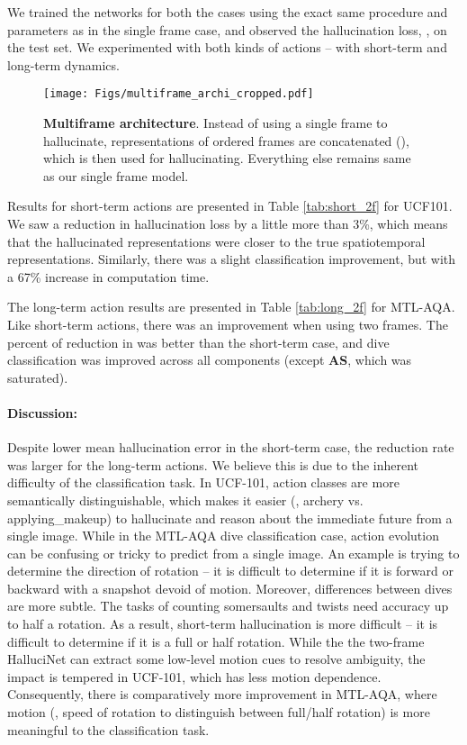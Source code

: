 \documentclass[10pt,twocolumn,letterpaper]{article}
\begin{document}
We trained the networks for both the cases using the exact same procedure and parameters as in the single frame case, and observed the hallucination loss, , on the test set. We experimented with both kinds of actions -- with short-term and long-term dynamics.

\begin{figure}
\centering
\texttt{[image: Figs/multiframe\_archi\_cropped.pdf]} 
\caption{\textbf{Multiframe architecture}. Instead of using a single frame to hallucinate, representations of ordered frames are concatenated (), which is then used for hallucinating. Everything else remains same as our single frame model.}
\label{fig:multiframe_archi}
\end{figure}

Results for short-term actions are presented in Table \ref{tab:short_2f} for UCF101. We saw a reduction in hallucination loss by a little more than 3\%, which means that the hallucinated representations were closer to the true spatiotemporal representations. Similarly, there was a slight classification improvement, but with a 67\% increase in computation time.

The long-term action results are presented in Table \ref{tab:long_2f} for MTL-AQA. Like short-term actions, there was an improvement when using two frames.  The percent of reduction in  was better than the short-term case, and dive classification was improved across all components (except \textbf{AS}, which was saturated).  


\paragraph{Discussion:} Despite lower mean hallucination error in the short-term case, the reduction rate was larger for the long-term actions.  We believe this is due to the inherent difficulty of the classification task.  In UCF-101, action classes are more semantically distinguishable, which makes it easier (\eg, archery vs. applying\_makeup) to hallucinate and reason about the immediate future from a single image.  While in the MTL-AQA dive classification case, action evolution can be confusing or tricky to predict from a single image.  An example is trying to determine the direction of rotation -- it is difficult to determine if it is forward or backward with a snapshot devoid of motion. Moreover, differences between dives are more subtle.  The tasks of counting somersaults and twists need accuracy up to half a rotation.  As a result, short-term hallucination is more difficult -- it is difficult to determine if it is a full or half rotation. While the the two-frame HalluciNet can extract some low-level motion cues to resolve ambiguity, the impact is tempered in UCF-101, which has less motion dependence.  Consequently, there is comparatively more improvement in MTL-AQA, where motion (\eg, speed of rotation to distinguish between full/half rotation) is more meaningful to the classification task.  
\end{document}
